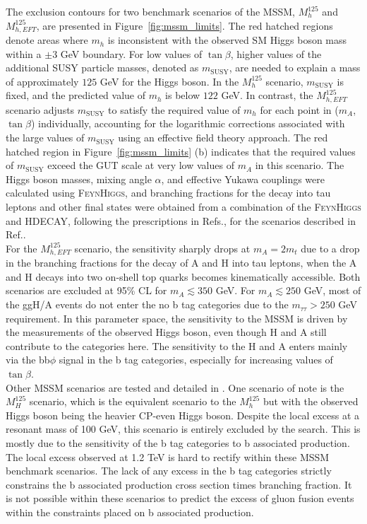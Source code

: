 The exclusion contours for two benchmark scenarios of the MSSM, $M_{h}^{125}$ and $M_{h,EFT}^{125}$, are presented in Figure~\ref{fig:mssm_limits}. 
The red hatched regions denote areas where $m_{h}$ is inconsistent with the observed SM Higgs boson mass within a ${\pm}3$ GeV boundary. 
For low values of $\tan\beta$, higher values of the additional SUSY particle masses, denoted as $m_{\text{SUSY}}$, are needed to explain a mass of approximately $125$ GeV for the Higgs boson. 
In the $M_{h}^{125}$ scenario, $m_{\text{SUSY}}$ is fixed, and the predicted value of $m_{h}$ is below $122$ GeV. 
In contrast, the $M_{h,EFT}^{125}$ scenario adjusts $m_{\text{SUSY}}$ to satisfy the required value of $m_{h}$ for each point in ($m_{A}$, $\tan\beta$) individually, accounting for the logarithmic corrections associated with the large values of $m_{\text{SUSY}}$ using an effective field theory approach. 
The red hatched region in Figure~\ref{fig:mssm_limits} (b) indicates that the required values of $m_{\text{SUSY}}$ exceed the GUT scale at very low values of $m_{A}$ in this scenario. 
The Higgs boson masses, mixing angle $\alpha$, and effective Yukawa couplings were calculated using \textsc{FeynHiggs}, and branching fractions for the decay into tau leptons and other final states were obtained from a combination of the \textsc{FeynHiggs} and \textsc{HDECAY}, following the prescriptions in Refs.\cite{LHCHiggsCrossSectionWorkingGroup:2013rie,deFlorian:2016spz,Denner:2011mq}, for the scenarios described in Ref.\cite{Bagnaschi:2791954}. \\

For the $M_{h,EFT}^{125}$ scenario, the sensitivity sharply drops at $m_{A}=2m_{t}$ due to a drop in the branching fractions for the decay of A and H into tau leptons, when the A and H decays into two on-shell top quarks becomes kinematically accessible. 
Both scenarios are excluded at 95\% CL for $m_{A}\lesssim350$ GeV. 
For $m_{A}\lesssim250$ GeV, most of the ggH/A events do not enter the no b tag categories due to the $m_{\tau\tau}>250$ GeV requirement. 
In this parameter space, the sensitivity to the MSSM is driven by the measurements of the observed Higgs boson, even though H and A still contribute to the categories here. 
The sensitivity to the H and A enters mainly via the bb$\phi$ signal in the b tag categories, especially for increasing values of $\tan\beta$. \\

Other MSSM scenarios are tested and detailed in \cite{CMS:2022rbd}.
One scenario of note is the $M_{H}^{125}$ scenario, which is the equivalent scenario to the $M_{h}^{125}$ but with the observed Higgs boson being the heavier CP-even Higgs boson.
Despite the local excess at a resonant mass of 100 GeV, this scenario is entirely excluded by the search. 
This is mostly due to the sensitivity of the b tag categories to b associated production.
The local excess observed at 1.2 TeV is hard to rectify within these MSSM benchmark scenarios.
The lack of any excess in the b tag categories strictly constrains the b associated production cross section times branching fraction.
It is not possible within these scenarios to predict the excess of gluon fusion events within the constraints placed on b associated production. \\

